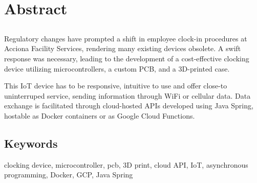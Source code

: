 \chapter*{Abstract}

\section*{\tituloPortadaEngVal}

Regulatory changes have prompted a shift in employee clock-in procedures at Acciona Facility Services, rendering many existing 
devices obsolete. A swift response was necessary, leading to the development of a cost-effective clocking device utilizing 
microcontrollers, a custom PCB, and a 3D-printed case.

This IoT device has to be responsive, intuitive to use and offer close-to uninterruped service, sending information through WiFi 
or cellular data. Data exchange is facilitated through cloud-hosted APIs developed using Java Spring, hostable as Docker containers
or as Google Cloud Functions.

\section*{Keywords}

\noindent clocking device, microcontroller, pcb, 3D print, cloud API, IoT, asynchronous programming, Docker, GCP, Java Spring




